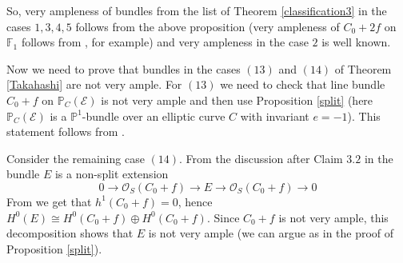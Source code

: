 \documentclass[a4paper]{amsart}
\theoremstyle{plain}
\theoremstyle{definition}
\begin{document}

So, very ampleness of bundles from the list of Theorem \ref{classification3} in the cases $1, 3, 4, 5$ follows from the above proposition (very ampleness of $C_0 +2f$ on $\mathbb F_1$ follows from \cite[Proposition 5.1]{Beltrametti_kjet}, for example) and very ampleness in the case $2$ is well known.

Now we need to prove that bundles in the cases $(13)$ and $(14)$ of Theorem \ref{Takahashi} are not very ample.
For $(13)$ we need to check that line bundle $C_0 + f$ on $\mathbb P_C(\mathcal E)$ is not very ample and then use Proposition \ref{split} (here $\mathbb P_C(\mathcal E)$ is a $\mathbb P^1$-bundle over an elliptic curve $C$ with invariant $e = -1$).
This statement follows from \cite[Theorem 4.3]{Gushel}.

Consider the remaining case $(14)$.
From the discussion after Claim $3.2$ in \cite{Takahashi} the bundle $E$ is a non-split extension
\[
0\to \mathcal O_S(C_0 +f) \to E \to \mathcal O_S(C_0+f) \to 0
\]
From \cite[Proposition 2.3]{Gushel} we get that $h^1(C_0 + f) = 0$, hence $H^0(E) \cong H^0(C_0+f)\oplus H^0(C_0 +f)$.
Since $C_0 +f$ is not very ample, this decomposition shows that $E$ is not very ample (we can argue as in the proof of Proposition \ref{split}).
\end{document}
